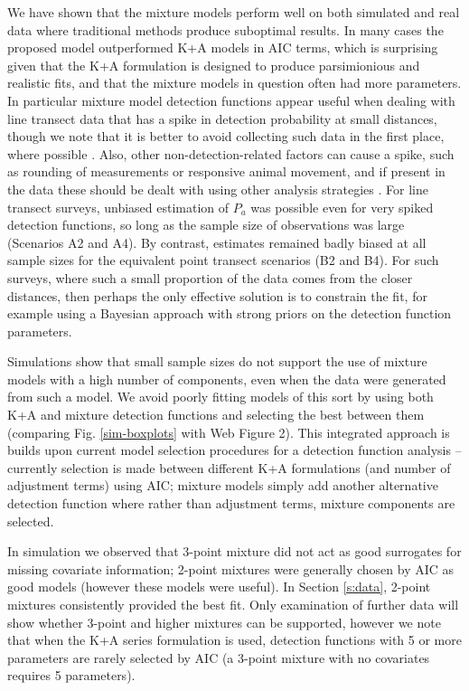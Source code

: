 \documentclass[useAMS,referee,usenatbib]{biom}
\begin{document}
We have shown that the mixture models perform well on both simulated and real data where traditional methods produce suboptimal results. In many cases the proposed model outperformed K+A models in AIC terms, which is surprising given that the K+A formulation is designed to produce parsimionious and realistic fits, and that the mixture models in question often had more parameters. In particular mixture model detection functions appear useful when dealing with line transect data that has a spike in detection probability at small distances, though we note that it is better to avoid collecting such data in the first place, where possible \citep{Buckland:2001vm}.  Also, other non-detection-related factors can cause a spike, such as rounding of measurements or responsive animal movement, and if present in the data these should be dealt with using other analysis strategies \citep[see][]{Buckland:2001vm}.  For line transect surveys, unbiased estimation of $P_a$ was possible even for very spiked detection functions, so long as the sample size of observations was large (Scenarios A2 and A4).  By contrast, estimates remained badly biased at all sample sizes for the equivalent point transect scenarios (B2 and B4). For such surveys, where such a small proportion of the data comes from the closer distances, then perhaps the only effective solution is to constrain the fit, for example using a Bayesian approach with strong priors on the detection function parameters.

Simulations show that small sample sizes do not support the use of mixture models with a high number of components, even when the data were generated from such a model. We avoid poorly fitting models of this sort by using both K+A and mixture detection functions and selecting the best between them (comparing Fig. \ref{sim-boxplots} with Web Figure 2). This integrated approach is builds upon current model selection procedures for a detection function analysis -- currently selection is made between different K+A formulations (and number of adjustment terms) using AIC; mixture models simply add another alternative detection function where rather than adjustment terms, mixture components are selected.

In simulation we observed that 3-point mixture did not act as good surrogates for missing covariate information; 2-point mixtures were generally chosen by AIC as good models (however these models were useful). In Section \ref{s:data}, 2-point mixtures consistently provided the best fit. Only examination of further data will show whether 3-point and higher mixtures can be supported, however we note that when the K+A series formulation is used, detection functions with 5 or more parameters are rarely selected by AIC (a 3-point mixture with no covariates requires 5 parameters).
\end{document}
